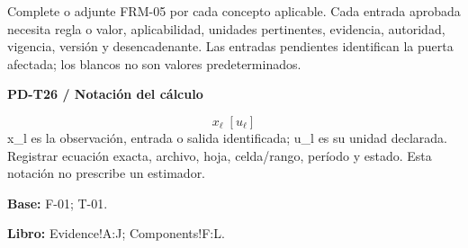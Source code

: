 \begin{Notice}Complete o adjunte FRM-05 por cada concepto aplicable. Cada entrada aprobada necesita regla o valor, aplicabilidad, unidades pertinentes, evidencia, autoridad, vigencia, versión y desencadenante. Las entradas pendientes identifican la puerta afectada; los blancos no son valores predeterminados.\end{Notice}
\par\begingroup\sffamily\fontsize{8}{10}\selectfont\color{NEBGreen}\setlength{\parskip}{2pt}\setlength{\abovedisplayskip}{4pt}\setlength{\belowdisplayskip}{4pt}\setlength{\abovedisplayshortskip}{2pt}\setlength{\belowdisplayshortskip}{3pt}
\textbf{PD-T26 / Notación del cálculo}\par
{\fontsize{9}{11}\selectfont\[ x_{\ell}\;[u_{\ell}] \]}
x\_l es la observación, entrada o salida identificada; u\_l es su unidad declarada. Registrar ecuación exacta, archivo, hoja, celda/rango, período y estado. Esta notación no prescribe un estimador.\par
\textbf{Base:} F-01; T-01.\par
\textbf{Libro:} Evidence!A:J; Components!F:L.\par\endgroup
